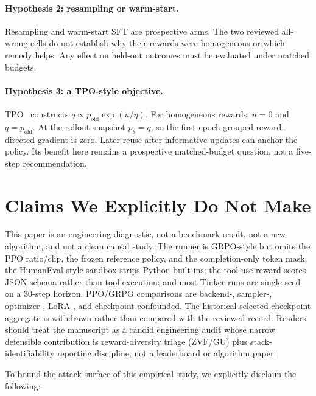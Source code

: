 \paragraph{Hypothesis 2: resampling or warm-start.}
Resampling and warm-start SFT are prospective arms. The two reviewed all-wrong
cells do not establish why their rewards were homogeneous or which remedy helps.
Any effect on held-out outcomes must be evaluated under matched budgets.

\paragraph{Hypothesis 3: a TPO-style objective.}
TPO~\citep{kaddour2026tpo} constructs $q\propto p_{\mathrm{old}}\exp(u/\eta)$.
For homogeneous rewards, $u=0$ and $q=p_{\mathrm{old}}$. At the rollout snapshot
$p_\theta=q$, so the first-epoch grouped reward-directed gradient is zero.
Later reuse after informative updates can anchor the policy. Its benefit here
remains a prospective matched-budget question, not a five-step recommendation.



\section*{Claims We Explicitly Do Not Make}
\label{sec:claims_we_do_not_make}

This paper is an engineering diagnostic, not a benchmark result, not a new algorithm, and not a clean causal study. The runner is GRPO-style but omits the PPO ratio/clip, the frozen reference policy, and the completion-only token mask; the HumanEval-style sandbox strips Python built-ins; the tool-use reward scores JSON schema rather than tool execution; and most Tinker runs are single-seed on a 30-step horizon. PPO/GRPO comparisons are backend-, sampler-, optimizer-, LoRA-, and checkpoint-confounded. The historical selected-checkpoint aggregate is withdrawn rather than compared with the reviewed record. Readers should treat the manuscript as a candid engineering audit whose narrow defensible contribution is reward-diversity triage (ZVF/GU) plus stack-identifiability reporting discipline, not a leaderboard or algorithm paper.

To bound the attack surface of this empirical study, we explicitly disclaim the following:


